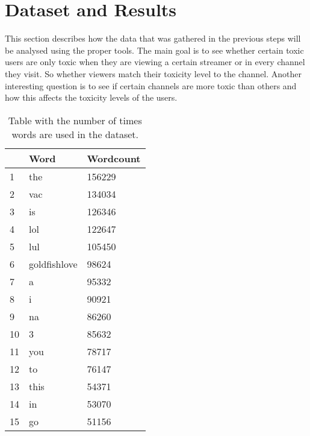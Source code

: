 \documentclass[final]{report}
\begin{document}
\chapter{Dataset and Results}
\label{ch:dataset}

This section describes how the data that was gathered in the previous steps will be analysed using the proper tools. The main goal is to see whether certain toxic users are only toxic when they are viewing a certain streamer or in every channel they visit. So whether viewers match their toxicity level to the channel. Another interesting question is to see if certain channels are more toxic than others and how this affects the toxicity levels of the users. 


\begin{table}[]
\centering
\caption{Table with the number of times words are used in the dataset.}
\label{wordcounttabel}
\begin{tabular}{l|l|l|}
\cline{2-3}
                         & Word         & Wordcount \\ \hline
\multicolumn{1}{|l|}{1}  & the          & 156229    \\ \hline
\multicolumn{1}{|l|}{2}  & vac          & 134034    \\ \hline
\multicolumn{1}{|l|}{3}  & is           & 126346    \\ \hline
\multicolumn{1}{|l|}{4}  & lol          & 122647    \\ \hline
\multicolumn{1}{|l|}{5}  & lul          & 105450    \\ \hline
\multicolumn{1}{|l|}{6}  & goldfishlove & 98624     \\ \hline
\multicolumn{1}{|l|}{7}  & a            & 95332     \\ \hline
\multicolumn{1}{|l|}{8}  & i            & 90921     \\ \hline
\multicolumn{1}{|l|}{9}  & na           & 86260     \\ \hline
\multicolumn{1}{|l|}{10} & 3            & 85632     \\ \hline
\multicolumn{1}{|l|}{11} & you          & 78717     \\ \hline
\multicolumn{1}{|l|}{12} & to           & 76147     \\ \hline
\multicolumn{1}{|l|}{13} & this         & 54371     \\ \hline
\multicolumn{1}{|l|}{14} & in           & 53070     \\ \hline
\multicolumn{1}{|l|}{15} & go           & 51156     \\ \hline

\end{tabular}
\end{table}
\end{document}
